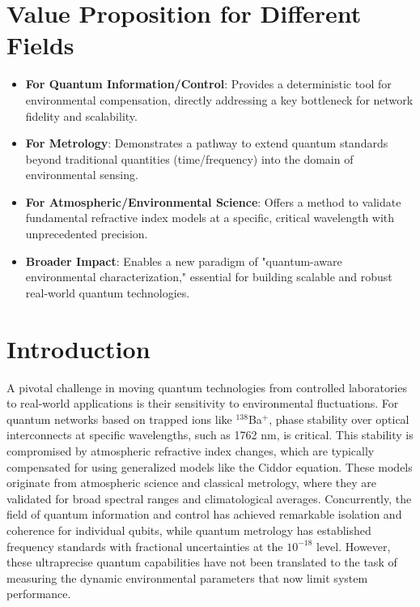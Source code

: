 \documentclass[aip,reprint,groupedaddress,onecolumn,superscriptaddress]{revtex4-2}
\begin{document}
\section{Value Proposition for Different Fields}
\begin{itemize}
    \item \textbf{For Quantum Information/Control}: Provides a deterministic tool for environmental compensation, directly addressing a key bottleneck for network fidelity and scalability.
    \item \textbf{For Metrology}: Demonstrates a pathway to extend quantum standards beyond traditional quantities (time/frequency) into the domain of environmental sensing.
    \item \textbf{For Atmospheric/Environmental Science}: Offers a method to validate fundamental refractive index models at a specific, critical wavelength with unprecedented precision.
    \item \textbf{Broader Impact}: Enables a new paradigm of "quantum-aware environmental characterization," essential for building scalable and robust real-world quantum technologies.
\end{itemize}

\newpage

\section{Introduction}

A pivotal challenge in moving quantum technologies from controlled laboratories to real-world applications is their sensitivity to environmental fluctuations. For quantum networks based on trapped ions like $^{138}$Ba$^+$, phase stability over optical interconnects at specific wavelengths, such as 1762 nm, is critical. This stability is compromised by atmospheric refractive index changes, which are typically compensated for using generalized models like the Ciddor equation. These models originate from atmospheric science and classical metrology, where they are validated for broad spectral ranges and climatological averages. Concurrently, the field of quantum information and control has achieved remarkable isolation and coherence for individual qubits, while quantum metrology has established frequency standards with fractional uncertainties at the $10^{-18}$ level. However, these ultraprecise quantum capabilities have not been translated to the task of measuring the dynamic environmental parameters that now limit system performance.
\end{document}
